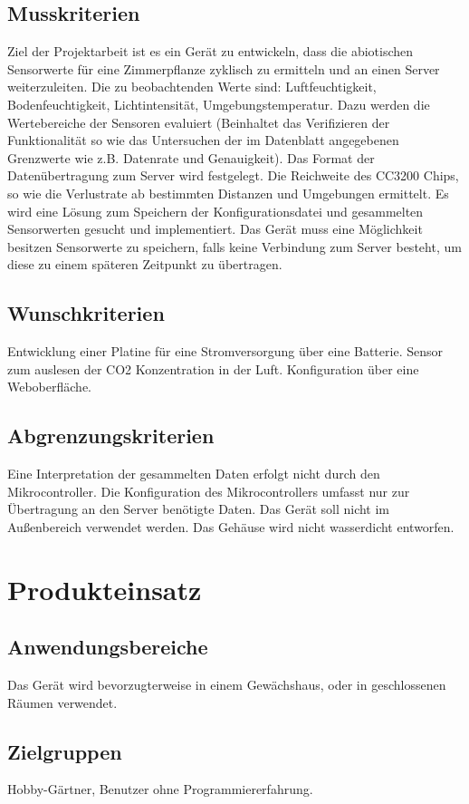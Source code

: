 \documentclass[pointlessnumbers]{scrartcl}
\begin{document}
\subsection{Musskriterien}
        Ziel der Projektarbeit ist es ein Gerät zu entwickeln, dass die abiotischen Sensorwerte für eine Zimmerpflanze zyklisch zu ermitteln und an einen Server weiterzuleiten. Die zu beobachtenden Werte sind: Luftfeuchtigkeit, Bodenfeuchtigkeit, Lichtintensität, Umgebungstemperatur.
        Dazu werden die Wertebereiche der Sensoren evaluiert (Beinhaltet das Verifizieren der Funktionalität so wie das Untersuchen der im Datenblatt angegebenen Grenzwerte wie z.B. Datenrate und Genauigkeit). Das Format der Datenübertragung zum Server wird festgelegt. Die Reichweite des CC3200 Chips, so wie die Verlustrate ab bestimmten Distanzen und Umgebungen ermittelt. 
    Es wird eine Lösung zum Speichern der Konfigurationsdatei und gesammelten Sensorwerten gesucht und implementiert. Das Gerät muss eine Möglichkeit besitzen Sensorwerte zu speichern, falls keine Verbindung zum Server besteht, um diese zu einem späteren Zeitpunkt zu übertragen.
\subsection{Wunschkriterien}
    Entwicklung einer Platine für eine Stromversorgung über eine Batterie. Sensor zum auslesen der CO2 Konzentration in der Luft. Konfiguration über eine Weboberfläche.
\subsection{Abgrenzungskriterien}
    Eine Interpretation der gesammelten Daten erfolgt nicht durch den Mikrocontroller.
    Die Konfiguration des Mikrocontrollers umfasst nur zur Übertragung an den Server benötigte Daten.
    Das Gerät soll nicht im Außenbereich verwendet werden. Das Gehäuse wird nicht wasserdicht entworfen.
\section{Produkteinsatz}
\subsection{Anwendungsbereiche}
    Das Gerät wird bevorzugterweise in einem Gewächshaus, oder in geschlossenen Räumen verwendet. 
\subsection{Zielgruppen}
    Hobby-Gärtner, Benutzer ohne Programmiererfahrung. 
\end{document}
